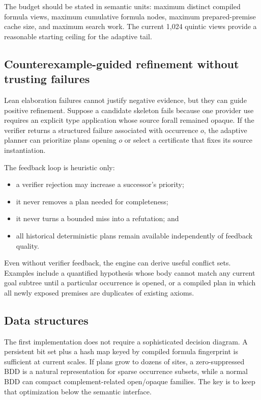 \documentclass[11pt]{article}
\begin{document}
The budget should be stated in semantic units: maximum distinct compiled
formula views, maximum cumulative formula nodes, maximum prepared-premise
cache size, and maximum search work.  The current 1,024 quintic views provide a
reasonable starting ceiling for the adaptive tail.

\subsection{Counterexample-guided refinement without trusting failures}

Lean elaboration failures cannot justify negative evidence, but they can guide
positive refinement.  Suppose a candidate skeleton fails because one provider
use requires an explicit type application whose source forall remained opaque.
If the verifier returns a structured failure associated with occurrence
\(o\), the adaptive planner can prioritize plans opening \(o\) or select a
certificate that fixes its source instantiation.

The feedback loop is heuristic only:

\begin{itemize}
  \item a verifier rejection may increase a successor's priority;
  \item it never removes a plan needed for completeness;
  \item it never turns a bounded miss into a refutation; and
  \item all historical deterministic plans remain available independently of
    feedback quality.
\end{itemize}

Even without verifier feedback, the engine can derive useful conflict sets.
Examples include a quantified hypothesis whose body cannot match any current
goal subtree until a particular occurrence is opened, or a compiled plan in
which all newly exposed premises are duplicates of existing axioms.

\subsection{Data structures}

The first implementation does not require a sophisticated decision diagram.
A persistent bit set plus a hash map keyed by compiled formula fingerprint is
sufficient at current scales.  If plans grow to dozens of sites, a zero-suppressed
BDD is a natural representation for sparse occurrence subsets, while a normal
BDD can compact complement-related open/opaque families.  The key is to keep
that optimization below the semantic interface.
\end{document}
